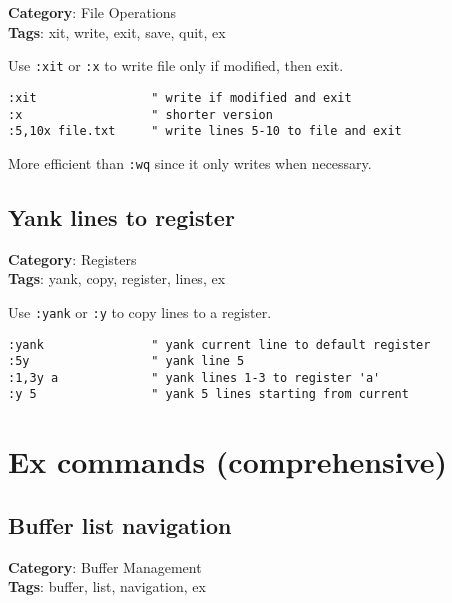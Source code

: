 {{{{\textbf{Category}: File Operations\\ \textbf{Tags}: xit, write, exit, save, quit, ex
\vspace{0.5cm}

Use {\footnotesize \Verb§:xit§} or {\footnotesize \Verb§:x§} to write file only if modified, then exit.

\begin{Exa*}{}
\begin{Verbatim}[fontsize=\footnotesize, breaklines, breakanywhere]
:xit                " write if modified and exit
:x                  " shorter version
:5,10x file.txt     " write lines 5-10 to file and exit
\end{Verbatim}
\end{Exa*}

More efficient than {\footnotesize \Verb§:wq§} since it only writes when necessary.

\section{Yank lines to register}

\textbf{Category}: Registers\\ \textbf{Tags}: yank, copy, register, lines, ex
\vspace{0.5cm}

Use {\footnotesize \Verb§:yank§} or {\footnotesize \Verb§:y§} to copy lines to a register.

\begin{Exa*}{}
\begin{Verbatim}[fontsize=\footnotesize, breaklines, breakanywhere]
:yank               " yank current line to default register
:5y                 " yank line 5
:1,3y a             " yank lines 1-3 to register 'a'
:y 5                " yank 5 lines starting from current
\end{Verbatim}
\end{Exa*}

\chapter{Ex commands (comprehensive)}
\section{Buffer list navigation}

\textbf{Category}: Buffer Management\\ \textbf{Tags}: buffer, list, navigation, ex
\vspace{0.5cm}

}}}}
